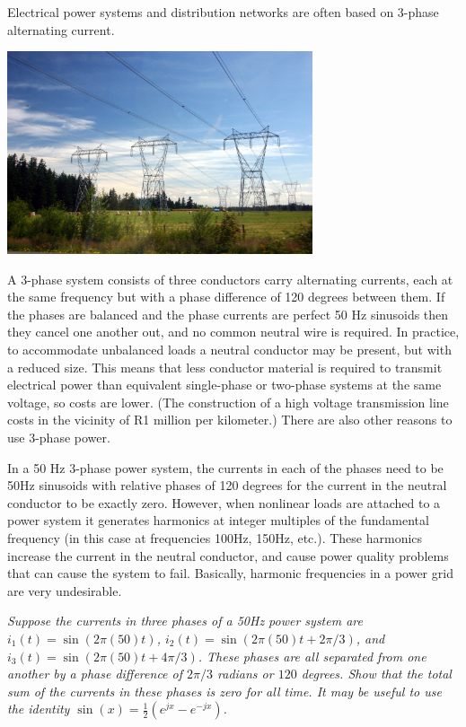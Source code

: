 \documentclass[10pt]{beamer}
\begin{document}
Electrical power systems and distribution networks are often based on 3-phase alternating current.  
\begin{center}
  \includegraphics[width=9cm]{threephasepower}
\end{center}
A 3-phase system consists of three conductors carry alternating currents, each at the same frequency but with a phase difference of 120 degrees between them.    If the phases are balanced and the phase currents are perfect 50 Hz sinusoids then they cancel one another out, and no common neutral wire is required.  In practice, to accommodate unbalanced loads a neutral conductor may be  present, but with a reduced size.  This means that less conductor material is required to transmit electrical power than equivalent single-phase or two-phase systems at the same voltage, so costs are lower.  (The construction of a high voltage transmission line costs in the vicinity of R1 million per kilometer.)  There are also other reasons to use 3-phase power.

In a 50 Hz 3-phase power system, the currents in each of the phases need to be 50Hz sinusoids with relative phases of 120 degrees for the current in the neutral conductor to be exactly zero.  However, when nonlinear loads are attached to a power system it generates harmonics at integer multiples of the fundamental frequency (in this case at frequencies 100Hz, 150Hz, etc.).  These harmonics increase the current in the neutral  conductor, and cause power quality problems that can cause the system to fail.  Basically, harmonic frequencies in a power grid are very undesirable.

{\em Suppose the currents in three phases of a 50Hz power system are $i_1(t) = \sin(2 \pi (50) t)$, $i_2(t) = \sin(2 \pi (50) t + 2 \pi/3)$, and $i_3(t) = \sin(2 \pi (50) t + 4\pi/3)$.  These phases are all separated from one another by a phase difference of $2 \pi/3$ radians or $120$ degrees.  Show that the total sum of the currents in these phases is zero for all time.  It may be useful to use the identity $\sin(x) = \frac{1}{2} (e^{j x} - e^{-j x})$.}
\end{document}
